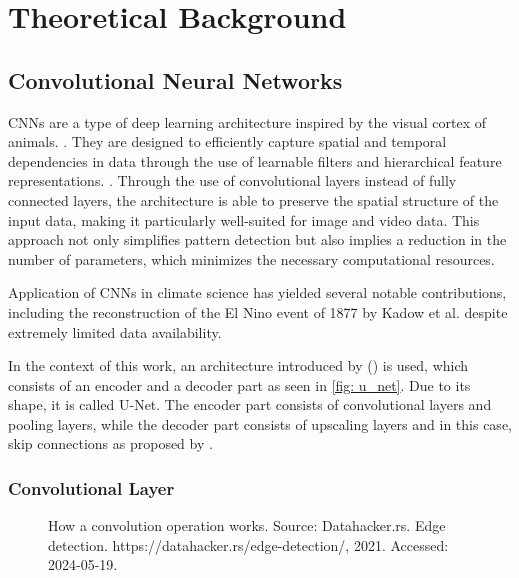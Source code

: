 \section{Theoretical Background}
\label{sec: theory}

\subsection{Convolutional Neural Networks}
\label{subsec:cnn}

CNNs are a type of deep learning architecture inspired by the visual cortex of animals. \cite{Yamashita2018CNN, hubel1968receptive}. They are designed to efficiently capture spatial and temporal dependencies in data through the use of learnable filters and hierarchical feature representations. \cite{Yamashita2018CNN}. Through the use of convolutional layers instead of fully connected layers, the architecture is able to preserve the spatial structure of the input data, making it particularly well-suited for image and video data. This approach not only simplifies pattern detection but also implies a reduction in the number of parameters, which minimizes the necessary computational resources.

Application of CNNs in climate science has yielded several notable contributions, including the reconstruction of the El Nino event of 1877 by Kadow et al. despite extremely limited data availability. \cite{kadow2020}

In the context of this work, an architecture introduced by (\cite{ronneberger2015}) is used, which consists of an encoder and a decoder part as seen in \autoref{fig: u_net}. Due to its shape, it is called U-Net. The encoder part consists of convolutional layers and pooling layers, while the decoder part consists of upscaling layers and in this case, skip connections as proposed by \cite{liu2018inpaining}.

\subsubsection*{Convolutional Layer}
\begin{figure}[H]
    \centering
    \caption{How a convolution operation works. Source: Datahacker.rs. Edge detection. https://datahacker.rs/edge-detection/, 2021.
    Accessed: 2024-05-19.}
    \label{fig: convolution_operation}
\end{figure}

